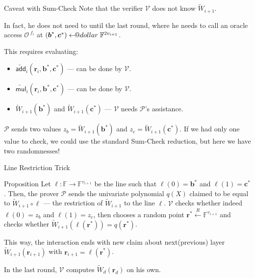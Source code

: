 \documentclass{zkdl-presentation-template}
\makeatletter
\newcommand\leftarrowS{\leftarrow\joinrel\smalldollar}
\newcommand{\smalldollar}{\mathrel{\mathpalette\small@dollar\relax}}
\newcommand{\small@dollar}[2]{%
  \vcenter{\hbox{%
    $#1\textnormal{\fontsize{0.7\dimexpr\f@size pt}{0}\selectfont\$}$%
  }}%
}
\makeatother
\begin{document}
    \begin{frame}{Caveat with Sum-Check}
        Note that the verifier $\mathcal{V}$ does not know $\widetilde{W}_{i+1}$.

        In fact, he does not need to until the last round, where he needs to
        call an oracle access $\mathcal{O}^{\; f_i}$ at $(\boldsymbol{b}^*,
        \boldsymbol{c}^*) \leftarrowS \mathbb{F}^{2v_{i+1}}$. 
        
        This requires evaluating:
        \begin{itemize}
            \item $\widetilde{\mathsf{add}}_i(\mathbf{r}_i,\boldsymbol{b}^*, \boldsymbol{c}^*)$ --- can be done by $\mathcal{V}$.
            \item $\widetilde{\mathsf{mul}}_i(\mathbf{r}_i,\boldsymbol{b}^*, \boldsymbol{c}^*)$ --- can be done by $\mathcal{V}$.
            \item $\widetilde{W}_{i+1}(\boldsymbol{b}^*)$ and $\widetilde{W}_{i+1}(\boldsymbol{c}^*)$ --- $\mathcal{V}$ needs $\mathcal{P}$'s assistance.
        \end{itemize}

        $\mathcal{P}$ sends two values $z_b =
        \widetilde{W}_{i+1}(\boldsymbol{b}^*)$ and $z_c =
        \widetilde{W}_{i+1}(\boldsymbol{c}^*)$.  If we had only one value to
        check, we could use the standard Sum-Check reduction, but here we have
        two randomnesses!
    \end{frame}

    \begin{frame}{Line Restriction Trick}
        \begin{block}{Proposition}
            Let $\ell: \mathbb{F} \to \mathbb{F}^{v_{i+1}}$ be the line such that
            $\ell(0)=\boldsymbol{b}^*$ and $\ell(1)=\boldsymbol{c}^*$. Then, the prover
            $\mathcal{P}$ sends the univariate polynomial $q(X)$ claimed to be equal to
            $\widetilde{W}_{i+1} \circ \ell$ --- the restriction of
            $\widetilde{W}_{i+1}$ to the line $\ell$. $\mathcal{V}$ checks whether
            indeed $\ell(0)=z_b$ and $\ell(1)=z_c$, then chooses a random point
            $\mathbf{r}^* \xleftarrow{R} \mathbb{F}^{v_{i+1}}$ and checks whether
            $\widetilde{W}_{i+1}(\ell(\mathbf{r}^*)) = q(\mathbf{r}^*)$.
        \end{block}

        This way, the interaction ends with new claim about next(previous) layer
        $\widetilde{W}_{i+1}(\mathbf{r}_{i+1})$ with
        $\mathbf{r}_{i+1}=\ell(\mathbf{r}^*)$.

        In the last round, $\mathcal{V}$ computes
        $\widetilde{W}_d(\mathbf{r}_d)$ on his own.
    \end{frame}
\end{document}
